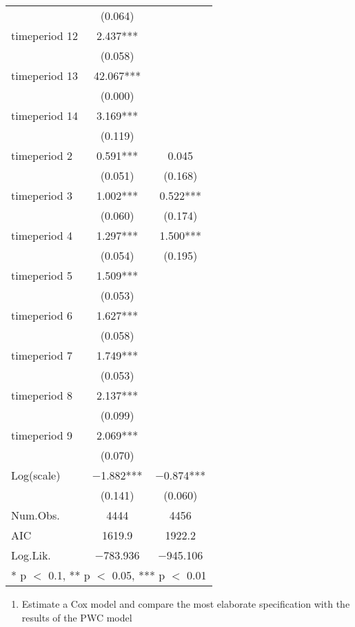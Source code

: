 \documentclass[
]{article}
\providecommand{\tightlist}{%
  \setlength{\itemsep}{0pt}\setlength{\parskip}{0pt}}
\begin{document}
\begin{table}[!h]
\begin{tabular}[t]{lcc}
 & (\num{0.064}) & \\
timeperiod 12 & \num{2.437}*** & \\
 & (\num{0.058}) \vphantom{1} & \\
timeperiod 13 & \num{42.067}*** & \\
 & (\num{0.000}) & \\
timeperiod 14 & \num{3.169}*** & \\
 & (\num{0.119}) & \\
timeperiod 2 & \num{0.591}*** & \num{0.045}\\
 & (\num{0.051}) & (\num{0.168})\\
timeperiod 3 & \num{1.002}*** & \num{0.522}***\\
 & (\num{0.060}) & (\num{0.174})\\
timeperiod 4 & \num{1.297}*** & \num{1.500}***\\
 & (\num{0.054}) & (\num{0.195})\\
timeperiod 5 & \num{1.509}*** & \\
 & (\num{0.053}) \vphantom{1} & \\
timeperiod 6 & \num{1.627}*** & \\
 & (\num{0.058}) & \\
timeperiod 7 & \num{1.749}*** & \\
 & (\num{0.053}) & \\
timeperiod 8 & \num{2.137}*** & \\
 & (\num{0.099}) & \\
timeperiod 9 & \num{2.069}*** & \\
 & (\num{0.070}) & \\
Log(scale) & \num{-1.882}*** & \num{-0.874}***\\
 & (\num{0.141}) & (\num{0.060})\\
\midrule
Num.Obs. & \num{4444} & \num{4456}\\
AIC & \num{1619.9} & \num{1922.2}\\
Log.Lik. & \num{-783.936} & \num{-945.106}\\
\bottomrule
\multicolumn{3}{l}{\rule{0pt}{1em}* p $<$ 0.1, ** p $<$ 0.05, *** p $<$ 0.01}\\
\end{tabular}
\end{table}

\clearpage

\begin{enumerate}
\def\labelenumi{\arabic{enumi}.}
\setcounter{enumi}{3}
\tightlist
\item
  Estimate a Cox model and compare the most elaborate specification with
  the results of the PWC model
\end{enumerate}
\end{document}
